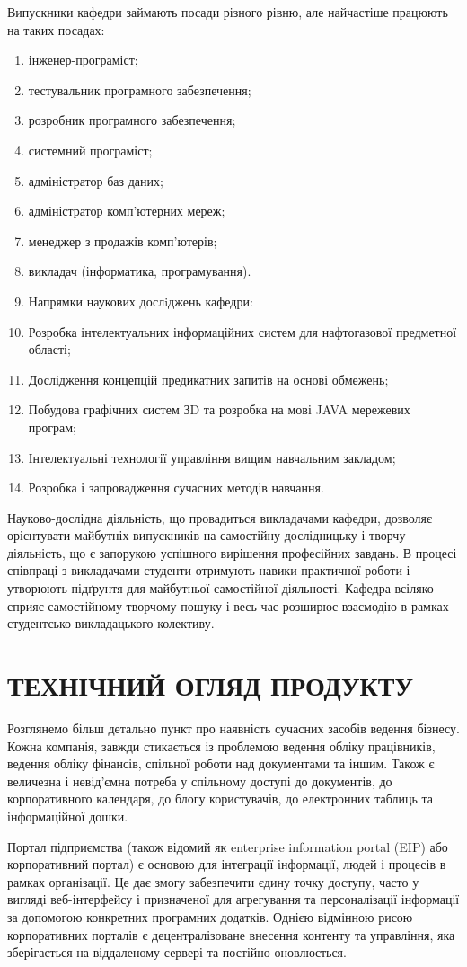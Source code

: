 Випускники кафедри займають посади різного рівню, але найчастіше працюють на таких посадах:
\begin{enumerate}
\item інженер-програміст;
\item тестувальник програмного забезпечення;
\item розробник програмного забезпечення;
\item системний програміст;
\item адміністратор баз даних;
\item адміністратор комп'ютерних мереж;
\item менеджер з продажів комп'ютерів;
\item викладач (інформатика, програмування).
\item Напрямки наукових дослiджень кафедри:
\item Розробка інтелектуальних інформаційних систем для нафтогазової предметної області;
\item Дослідження концепцій предикатних запитів на основі обмежень;
\item Побудова графічних систем ЗD та розробка на мові JAVA мережевих програм;
\item Інтелектуальні технології управління вищим навчальним закладом;
\item Розробка і запровадження сучасних методів навчання.
\end{enumerate}

Науково-дослідна діяльність, що провадиться викладачами кафедри, дозволяє орієнтувати майбутніх випускників на самостійну дослідницьку і творчу діяльність, що є запорукою успішного вирішення професійних завдань. В процесі співпраці з викладачами студенти отримують навики практичної роботи і утворюють підґрунтя для майбутньої самостійної діяльності. Кафедра всіляко сприяє самостійному творчому пошуку і весь час розширює взаємодію в рамках студентсько-викладацького колективу.

\section{ТЕХНІЧНИЙ ОГЛЯД ПРОДУКТУ}
Розглянемо більш детально пункт про наявність сучасних засобів ведення бізнесу. 
Кожна компанія, завжди стикається із проблемою ведення обліку працівників, ведення обліку фінансів, спільної роботи над документами та іншим.
Також є величезна і невід'ємна потреба у спільному доступі до документів, до корпоративного календаря, до блогу користувачів, до електронних таблиць та інформаційної дошки.
\par Портал підприємства (також відомий як enterprise information portal (EIP) або корпоративний портал) є основою для інтеграції інформації, людей і процесів в рамках організації. 
Це дає змогу забезпечити єдину точку доступу, часто у вигляді веб-інтерфейсу і призначеної для агрегування та персоналізації інформації за допомогою конкретних програмних додатків. Однією відмінною рисою корпоративних порталів є децентралізоване внесення контенту та управління, яка зберігається на віддаленому сервері та постійно оновлюється.
